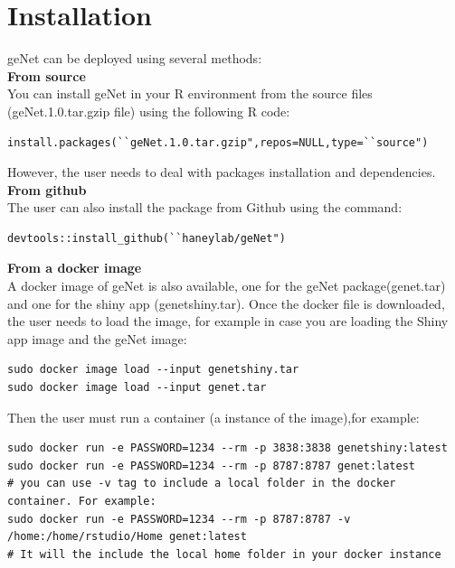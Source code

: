 \documentclass{article}
\begin{document}
\newpage
\section{Installation}

geNet can be deployed using several methods: \\
\textbf{From source} \\
You can install geNet in your R environment from the source files (geNet.1.0.tar.gzip file) using the following R code:\\
\begin{framed}
\begin{lstlisting}
install.packages(``geNet.1.0.tar.gzip",repos=NULL,type=``source")
\end{lstlisting}
\end{framed}
However, the user needs to deal with packages installation and dependencies.\\
\textbf{From github}\\ 
The user can also install the package from Github using the command:\\
\begin{framed}
\begin{lstlisting}
devtools::install_github(``haneylab/geNet")
\end{lstlisting}
\end{framed}
\textbf{From a docker image}\\ 
A docker image of geNet is also available, one for the geNet package(genet.tar) and one for the shiny app (genetshiny.tar).
Once the docker file is downloaded, the user needs to load the image, for example in case you are loading the Shiny app image and the geNet image:
\begin{framed}
\begin{lstlisting}
sudo docker image load --input genetshiny.tar
sudo docker image load --input genet.tar
\end{lstlisting}
\end{framed}
Then the user must run a container (a instance of the image),for example:
\begin{framed}
\begin{lstlisting}
sudo docker run -e PASSWORD=1234 --rm -p 3838:3838 genetshiny:latest
sudo docker run -e PASSWORD=1234 --rm -p 8787:8787 genet:latest
# you can use -v tag to include a local folder in the docker container. For example:
sudo docker run -e PASSWORD=1234 --rm -p 8787:8787 -v /home:/home/rstudio/Home genet:latest
# It will the include the local home folder in your docker instance
\end{lstlisting}
\end{framed}
\end{document}
